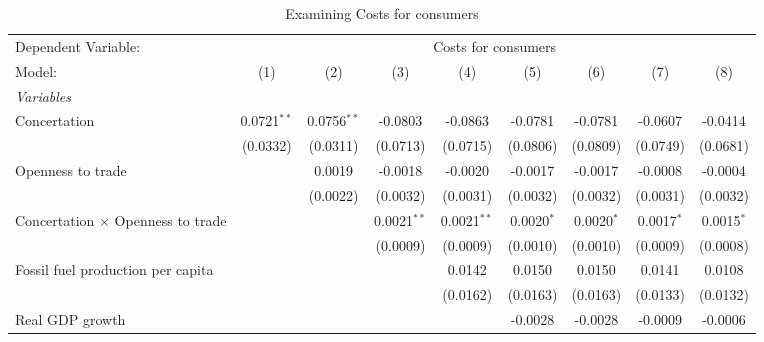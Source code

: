 
\begin{table}[htbp]
   \caption{Examining Costs for consumers}
   \centering
   \begin{tabular}{lcccccccc}
      \tabularnewline \midrule \midrule
      Dependent Variable: & \multicolumn{8}{c}{Costs for consumers}\\
      Model:                                   & (1)           & (2)           & (3)           & (4)           & (5)          & (6)                   & (7)          & (8)\\  
      \midrule
      \emph{Variables}\\
      Concertation                             & 0.0721$^{**}$ & 0.0756$^{**}$ & -0.0803       & -0.0863       & -0.0781      & -0.0781               & -0.0607      & -0.0414\\   
                                               & (0.0332)      & (0.0311)      & (0.0713)      & (0.0715)      & (0.0806)     & (0.0809)              & (0.0749)     & (0.0681)\\   
      Openness to trade                        &               & 0.0019        & -0.0018       & -0.0020       & -0.0017      & -0.0017               & -0.0008      & -0.0004\\   
                                               &               & (0.0022)      & (0.0032)      & (0.0031)      & (0.0032)     & (0.0032)              & (0.0031)     & (0.0032)\\   
      Concertation $\times$ Openness to trade  &               &               & 0.0021$^{**}$ & 0.0021$^{**}$ & 0.0020$^{*}$ & 0.0020$^{*}$          & 0.0017$^{*}$ & 0.0015$^{*}$\\   
                                               &               &               & (0.0009)      & (0.0009)      & (0.0010)     & (0.0010)              & (0.0009)     & (0.0008)\\   
      Fossil fuel production per capita        &               &               &               & 0.0142        & 0.0150       & 0.0150                & 0.0141       & 0.0108\\   
                                               &               &               &               & (0.0162)      & (0.0163)     & (0.0163)              & (0.0133)     & (0.0132)\\   
      Real GDP growth                          &               &               &               &               & -0.0028      & -0.0028               & -0.0009      & -0.0006\\   

\end{tabular}
\end{table}

